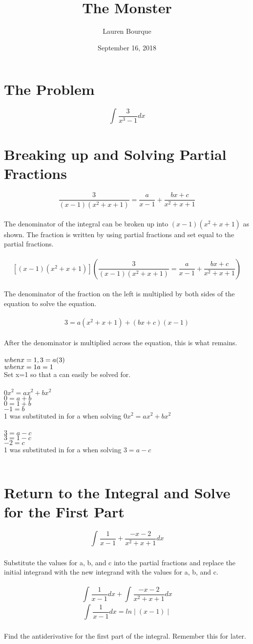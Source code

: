 \documentclass[12 pt]{article}
\title{The Monster}
\author{Lauren Bourque }
\date{September 16, 2018}
\begin{document}
\maketitle

\section{The Problem}
$$\int_{}^{} \frac{3}{x^3-1} dx$$
\section{Breaking up and Solving Partial Fractions}
$$\frac{3}{(x-1)(x^2+x+1)}=\frac{a}{x-1}+\frac{bx+c}{x^2+x+1}$$\\
The denominator of the integral can be broken up into $(x-1)(x^2+x+1)$ as shown. The fraction is written by using partial fractions and set equal to the partial fractions.\\\\
$$[(x-1)(x^2+x+1)](\frac{3}{(x-1)(x^2+x+1)}=\frac{a}{x-1}+\frac{bx+c}{x^2+x+1})$$\\
The denominator of the fraction on the left is multiplied by both sides of the equation to solve the equation.\\\\
$$3=a(x^2+x+1)+(bx+c)(x-1)$$\\
After the denominator is multiplied across the equation, this is what remains.\\\\
$when x=1,\\
3=a(3)$\\
$when x=1\\
a=1$\\
Set x=1 so that a can easily be solved for.\\\\
$0x^2=ax^2+bx^2$\\
$0=a+b$\\
$0=1+b$\\
$-1=b$\\
1 was substituted in for a when solving $0x^2=ax^2+bx^2$\\\\
$3=a-c$\\
$3=1-c$\\
$-2=c$\\
1 was substituted in for a when solving $3=a-c$\\\\
\section{Return to the Integral and Solve for the First Part}
$$\int_{}^{} \frac{1}{x-1}+\frac{-x-2}{x^2+x+1} dx$$\\
Substitute the values for a, b, and c into the partial fractions and replace the initial integrand with the new integrand with the values for a, b, and c.\\\\
$$\int_{}^{} \frac{1}{x-1} dx+ \int_{}^{} \frac{-x-2}{x^2+x+1} dx$$
$$\int_{}^{} \frac{1}{x-1} dx= ln \mid(x-1)\mid$$\\
Find the antiderivative for the first part of the integral. Remember this for later.\\\\
\end{document}
